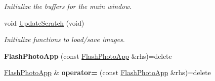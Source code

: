 \begin{DoxyCompactItemize}
\begin{DoxyCompactList}\small\item\em Initialize the buffers for the main window. \end{DoxyCompactList}\item 
void \hyperlink{classimage__tools_1_1FlashPhotoApp_ac843488741db2be6003e5df352c17e32}{Update\+Scratch} (void)\hypertarget{classimage__tools_1_1FlashPhotoApp_ac843488741db2be6003e5df352c17e32}{}\label{classimage__tools_1_1FlashPhotoApp_ac843488741db2be6003e5df352c17e32}

\begin{DoxyCompactList}\small\item\em Initialize functions to load/save images. \end{DoxyCompactList}\item 
{\bfseries Flash\+Photo\+App} (const \hyperlink{classimage__tools_1_1FlashPhotoApp}{Flash\+Photo\+App} \&rhs)=delete\hypertarget{classimage__tools_1_1FlashPhotoApp_a3009fefcee5cd98e46e6b4dc3b3cf6be}{}\label{classimage__tools_1_1FlashPhotoApp_a3009fefcee5cd98e46e6b4dc3b3cf6be}

\item 
\hyperlink{classimage__tools_1_1FlashPhotoApp}{Flash\+Photo\+App} \& {\bfseries operator=} (const \hyperlink{classimage__tools_1_1FlashPhotoApp}{Flash\+Photo\+App} \&rhs)=delete\hypertarget{classimage__tools_1_1FlashPhotoApp_a9ecfbf7bd80d0ef20ba5cf6b61538699}{}\label{classimage__tools_1_1FlashPhotoApp_a9ecfbf7bd80d0ef20ba5cf6b61538699}

\end{DoxyCompactItemize}
